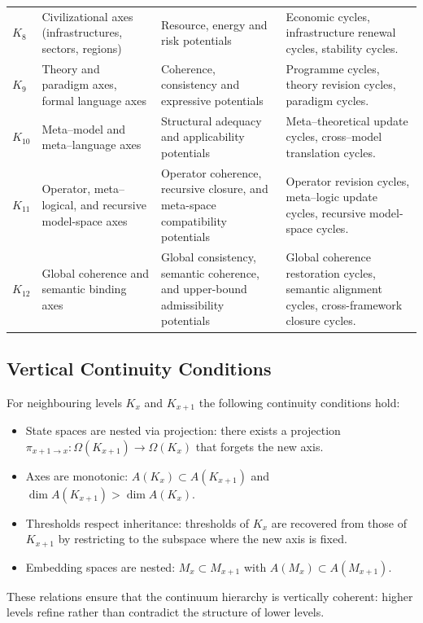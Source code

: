 \begin{table}[htbp]
\begin{tabular}{@{}L{0.08\textwidth}L{0.18\textwidth}L{0.22\textwidth}L{0.42\textwidth}@{}}
    \(K_8\) &
      Civilizational axes (infrastructures, sectors, regions) &
      Resource, energy and risk potentials &
      Economic cycles, infrastructure renewal cycles, stability cycles. \\[0.3em]
    \(K_9\) &
      Theory and paradigm axes, formal language axes &
      Coherence, consistency and expressive potentials &
      Programme cycles, theory revision cycles, paradigm cycles. \\[0.3em]
    \(K_{10}\) &
      Meta--model and meta--language axes &
      Structural adequacy and applicability potentials &
      Meta--theoretical update cycles, cross--model translation cycles. \\[0.3em]
    \(K_{11}\) &
      Operator, meta--logical, and recursive model-space axes &
      Operator coherence, recursive closure, and meta-space compatibility potentials &
      Operator revision cycles, meta--logic update cycles, recursive model-space cycles. \\[0.3em]
    \(K_{12}\) &
      Global coherence and semantic binding axes &
      Global consistency, semantic coherence, and upper-bound admissibility potentials &
      Global coherence restoration cycles, semantic alignment cycles, cross-framework closure cycles. \\
    \hline
  \end{tabular}
\end{table}

\subsection{Vertical Continuity Conditions}

For neighbouring levels \(K_x\) and \(K_{x+1}\) the following continuity
conditions hold:

\begin{itemize}
  \item State spaces are nested via projection:
        there exists a projection
        \(\pi_{x+1\to x} : \Omega(K_{x+1}) \to \Omega(K_x)\)
        that forgets the new axis.
  \item Axes are monotonic:
        \(A(K_x)\subset A(K_{x+1})\) and
        \(\dim A(K_{x+1}) > \dim A(K_x)\).
  \item Thresholds respect inheritance:
        thresholds of \(K_x\) are recovered from those of \(K_{x+1}\) by
        restricting to the subspace where the new axis is fixed.
  \item Embedding spaces are nested:
        \(M_x\subset M_{x+1}\) with
        \(A(M_x)\subset A(M_{x+1})\).
\end{itemize}

These relations ensure that the continuum hierarchy is vertically coherent:
higher levels refine rather than contradict the structure of lower levels.



\endgroup
